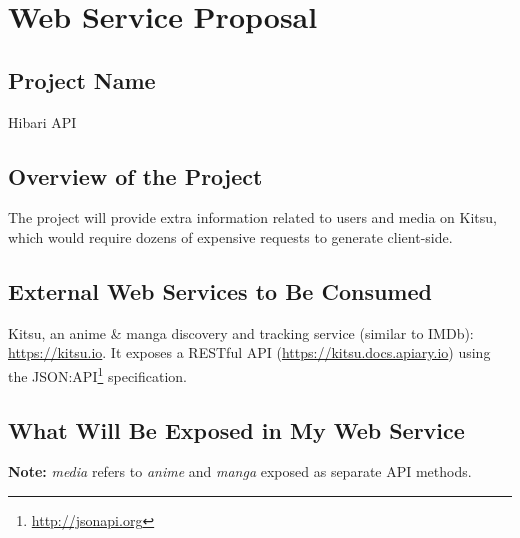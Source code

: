 \section{Web Service Proposal}
\subsection{Project Name}

Hibari API

\subsection{Overview of the Project}

The project will provide extra information  related to users and media on Kitsu, which would require dozens of expensive requests to generate client-side.

\subsection{External Web Services to Be Consumed}

Kitsu, an anime \& manga discovery and tracking service (similar to IMDb): \url{https://kitsu.io}. It exposes a RESTful API (\url{https://kitsu.docs.apiary.io}) using the JSON:API\footnote{\url{http://jsonapi.org}} specification.

\subsection{What Will Be Exposed in My Web Service}


\textbf{Note:} \textit{media} refers to \textit{anime} and \textit{manga} exposed as separate API methods.


